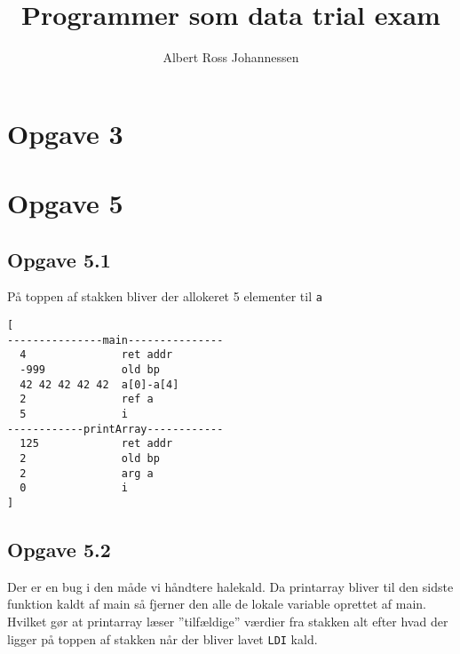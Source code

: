 \documentclass[11pt,a4paper]{article}
\begin{document}
\begin{titlepage}
  \title{Programmer som data trial exam}
  \author{Albert Ross Johannessen}
  \maketitle
  \newpage
  \thispagestyle{empty}
  \newpage
\end{titlepage}

\pagestyle{fancy}
\fancyhf{}
\newpage
\section{Opgave 3}
\begin{mathpar}
\end{mathpar}
\section{Opgave 5}
\subsection{Opgave 5.1}
På toppen af stakken bliver der allokeret 5 elementer til \Verb|a| 
\begin{verbatim}
[ 
---------------main---------------
  4               ret addr
  -999            old bp
  42 42 42 42 42  a[0]-a[4]
  2               ref a
  5               i
------------printArray------------
  125             ret addr
  2               old bp
  2               arg a
  0               i
]
\end{verbatim}
\subsection{Opgave 5.2}
Der er en bug i den måde vi håndtere halekald. Da printarray bliver til den sidste funktion kaldt af main så fjerner den alle de lokale variable oprettet af main. Hvilket gør at printarray læser ''tilfældige'' værdier fra stakken alt efter hvad der ligger på toppen af stakken når der bliver lavet \Verb|LDI| kald.
\end{document}
